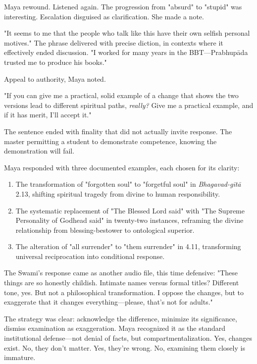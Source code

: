 \documentclass[12pt,twoside]{book}
\begin{document}
Maya rewound. Listened again. The progression from "absurd" to "stupid" was interesting. Escalation disguised as clarification. She made a note.

"It seems to me that the people who talk like this have their own selfish personal motives." The phrase delivered with precise diction, in contexts where it effectively ended discussion. "I worked for many years in the BBT—Prabhupāda trusted me to produce his books."

Appeal to authority, Maya noted.

"If you can give me a practical, solid example of a change that shows the two versions lead to different spiritual paths, \emph{really?} Give me a practical example, and if it has merit, I'll accept it."

The sentence ended with finality that did not actually invite response. The master permitting a student to demonstrate competence, knowing the demonstration will fail.

Maya responded with three documented examples, each chosen for its clarity:

\begin{enumerate}
\item The transformation of "forgotten soul" to "forgetful soul" in \emph{Bhagavad-gītā} 2.13, shifting spiritual tragedy from divine to human responsibility.

\item The systematic replacement of "The Blessed Lord said" with "The Supreme Personality of Godhead said" in twenty-two instances, reframing the divine relationship from blessing-bestower to ontological superior.

\item The alteration of "all surrender" to "them surrender" in 4.11, transforming universal reciprocation into conditional response.
\end{enumerate}

The Swami's response came as another audio file, this time defensive: "These things are so honestly childish. Intimate names versus formal titles? Different tone, yes. But not a philosophical transformation. I oppose the changes, but to exaggerate that it changes everything—please, that's not for adults."

The strategy was clear: acknowledge the difference, minimize its significance, dismiss examination as exaggeration. Maya recognized it as the standard institutional defense—not denial of facts, but compartmentalization. Yes, changes exist. No, they don't matter. Yes, they're wrong. No, examining them closely is immature.
\end{document}
